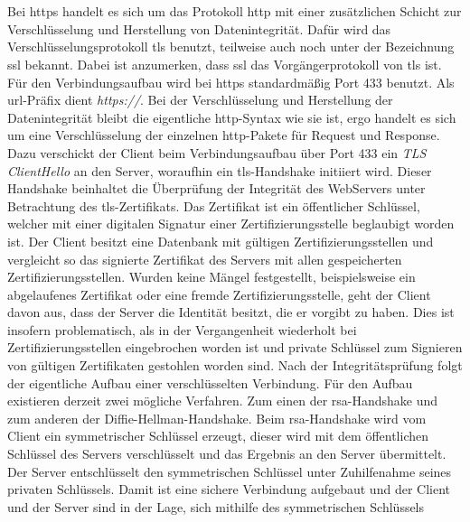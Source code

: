 \documentclass[titlepage]{report}
\begin{document}
\section{}
Bei \gls{https} handelt es sich um das Protokoll \gls{http} mit einer
zusätzlichen Schicht zur Verschlüsselung und Herstellung von
Datenintegrität. Dafür wird das Verschlüsselungsprotokoll \gls{tls}
benutzt, teilweise auch noch unter der Bezeichnung \gls{ssl} bekannt.
Dabei ist anzumerken, dass \gls{ssl} das Vorgängerprotokoll von
\gls{tls} ist.
Für den Verbindungsaufbau wird bei \gls{https} standardmäßig
Port 433 benutzt\cite[Siehe Section 2.3]{RFC2818}. Als
\gls{url}\hyp{}Präfix dient \emph{https://}. Bei der Verschlüsselung und
Herstellung der Datenintegrität bleibt die eigentliche
\gls{http}\hyp{}Syntax wie sie ist, ergo handelt es sich um eine Verschlüsselung der
einzelnen \gls{http}\hyp{}Pakete für Request und Response. Dazu verschickt der Client beim
Verbindungsaufbau über Port 433 ein \emph{TLS ClientHello} an den
Server, woraufhin ein \gls{tls}\hyp{}Handshake initiiert wird.
Dieser Handshake beinhaltet die Überprüfung der Integrität des WebServers
unter Betrachtung des \gls{tls}\hyp{}Zertifikats. Das Zertifikat ist
ein öffentlicher Schlüssel, welcher mit einer
digitalen Signatur einer Zertifizierungsstelle beglaubigt worden ist.
Der Client besitzt eine Datenbank mit gültigen Zertifizierungsstellen
und vergleicht so das signierte Zertifikat des Servers mit allen
gespeicherten Zertifizierungsstellen. Wurden keine Mängel
festgestellt, beispielsweise ein abgelaufenes Zertifikat oder eine
fremde Zertifizierungsstelle, geht der Client davon aus, dass der Server
die Identität besitzt, die er vorgibt zu haben. Dies ist insofern
problematisch, als in der Vergangenheit wiederholt bei
Zertifizierungsstellen eingebrochen worden ist und private Schlüssel zum
Signieren von gültigen Zertifikaten gestohlen worden
sind\cite{PRIVATEKEYSSTOLEN}. Nach der Integritätsprüfung folgt der
eigentliche Aufbau einer verschlüsselten Verbindung. Für den Aufbau
existieren derzeit zwei mögliche Verfahren. Zum einen der
\gls{rsa}\hyp{}Handshake und zum anderen der
Diffie\hyp{}Hellman\hyp{}Handshake\cite{TLS}. Beim
\gls{rsa}\hyp{}Handshake wird vom Client ein symmetrischer Schlüssel
erzeugt, dieser wird mit dem öffentlichen Schlüssel des Servers
verschlüsselt und das Ergebnis an den Server übermittelt. Der Server entschlüsselt den
symmetrischen Schlüssel unter Zuhilfenahme seines privaten Schlüssels.
Damit ist eine sichere Verbindung aufgebaut und der Client und der Server
sind in der Lage, sich mithilfe des symmetrischen Schlüssels
\end{document}
